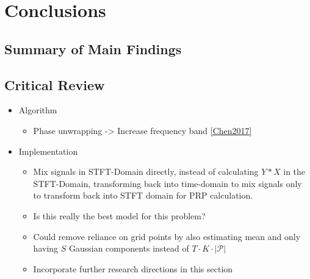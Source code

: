 \chapter{Conclusions}
\label{chap:concl}


\section{Summary of Main Findings}

\section{Critical Review}
\label{sec:critical-review}

\begin{itemize}
    \item Algorithm
    \begin{itemize}
        \item Phase unwrapping -> Increase frequency band \ref{Chen2017}
    \end{itemize}
    \item Implementation
    \begin{itemize}
        \item Mix signals in STFT-Domain directly, instead of calculating $Y*X$ in the STFT-Domain, transforming back into time-domain to mix signals only to transform back into STFT domain for PRP calculation.
        \item Is this really the best model for this problem?
        \item Could remove reliance on grid points by also estimating mean and only having $S$ Gaussian components instead of $T\cdot K\cdot |\mathcal{P}|$
        \item Incorporate further research directions in this section
    \end{itemize}
\end{itemize}
